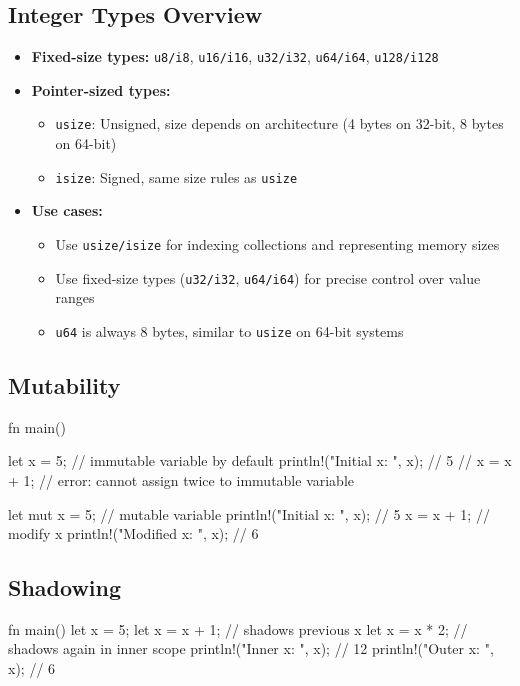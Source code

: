 \documentclass[8pt,a4paper,twocolumn]{extarticle}
\begin{document}
\subsection{Integer Types Overview}
\begin{itemize}
    \item \textbf{Fixed-size types:} \texttt{u8/i8}, \texttt{u16/i16}, \texttt{u32/i32}, \texttt{u64/i64}, \texttt{u128/i128}
    \item \textbf{Pointer-sized types:}
    \begin{itemize}
        \item \texttt{usize}: Unsigned, size depends on architecture (4 bytes on 32-bit, 8 bytes on 64-bit)
        \item \texttt{isize}: Signed, same size rules as \texttt{usize}
    \end{itemize}
    \item \textbf{Use cases:}
    \begin{itemize}
        \item Use \texttt{usize/isize} for indexing collections and representing memory sizes
        \item Use fixed-size types (\texttt{u32/i32}, \texttt{u64/i64}) for precise control over value ranges
        \item \texttt{u64} is always 8 bytes, similar to \texttt{usize} on 64-bit systems
    \end{itemize}
\end{itemize}

\subsection{Mutability}
\begin{Code}
fn main() {
    let x = 5;     // immutable variable by default
    println!("Initial x: {}", x); // 5
    // x = x + 1;  // error: cannot assign twice to immutable variable

    let mut x = 5; // mutable variable
    println!("Initial x: {}", x); // 5
    x = x + 1;     // modify x
    println!("Modified x: {}", x); // 6
}
\end{Code}

\subsection{Shadowing}
\begin{Code}
fn main() {
    let x = 5;
    let x = x + 1; // shadows previous x
    {
        let x = x * 2; // shadows again in inner scope
        println!("Inner x: {}", x); // 12
    }
    println!("Outer x: {}", x); // 6
}
\end{Code}
\end{document}
